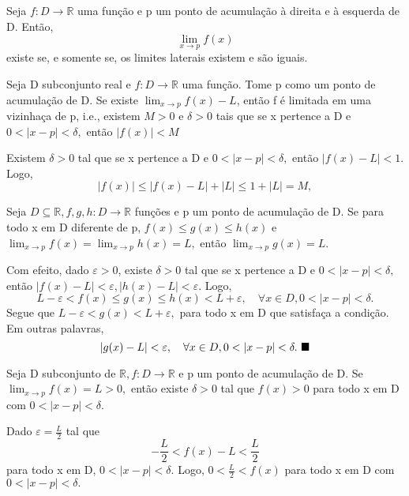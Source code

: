 \documentclass[Analysis/analysis_notes.tex]{subfiles}
\begin{document}
\begin{crl*}
	Seja $f:D\rightarrow \mathbb{R}$ uma fun\c c\~ao e p um ponto de acumula\c c\~ao \`a direita e \`a esquerda de D. Ent\~ao,
	$$
		\lim_{x\to p}f(x)
	$$
	existe se, e somente se, os limites laterais existem e s\~ao iguais.
\end{crl*}
\begin{theorem*}
	Seja D subconjunto real e $f:D\rightarrow \mathbb{R}$ uma fun\c c\~ao. Tome p como um ponto de acumula\c c\~ao de D. Se
	existe $\lim_{x\to p}f(x) - L$, ent\~ao f \'e limitada em uma vizinha\c ca de p, i.e., existem $M>0$ e $\delta > 0$ tais que
	se x pertence a D e $0 <|x-p| < \delta,$ ent\~ao $|f(x)|< M$
\end{theorem*}
\begin{proof*}
	Existem $\delta > 0$ tal que se x pertence a D e $0<|x-p|<\delta,$ ent\~ao $|f(x)-L|<1.$ Logo,
	$$
		|f(x)| \leq{|f(x)-L| + |L|} \leq{1 + |L| = M},
	$$
\end{proof*}
\begin{theorem*}
	Seja $D\subseteq{\mathbb{R}}, f, g, h:D\rightarrow \mathbb{R}$ fun\c c\~oes e p um ponto de acumula\c c\~ao de D. Se
	para todo x em D diferente de p, $f(x)\leq{g(x)}\leq{h(x)}$ e $\lim_{x\to p}f(x) = \lim_{x\to p }h(x) = L,$ ent\~ao $\lim_{x\to p}g(x) = L.$
\end{theorem*}
\begin{proof*}
	Com efeito, dado $\varepsilon > 0$, existe $\delta > 0$ tal que se x pertence a D e $0 < |x-p| < \delta,$ ent\~ao
	$|f(x)-L|<\varepsilon, |h(x)-L|<\varepsilon.$ Logo,
	$$
		L - \varepsilon < f(x) \leq{g(x)} \leq{h(x)} < L +\varepsilon, \quad \forall x\in D, 0<|x-p|<\delta.
	$$
	Segue que $L-\varepsilon < g(x) < L+\varepsilon,$ para todo x em D que satisfa\c ca a condi\c c\~ao. Em outras palavras,
	$$
		|g(x)-L| < \varepsilon, \quad \forall x\in D, 0<|x-p|<\delta.\text{ \qedsymbol}
	$$
\end{proof*}
\begin{theorem*}
	Seja D subconjunto de $\mathbb{R}, f:D\rightarrow \mathbb{R}$ e p um ponto de acumula\c c\~ao de D. Se $\lim_{x\to p}f(x) = L > 0,$
	ent\~ao existe $\delta > 0$ tal que $f(x) > 0$ para todo x em D com $0<|x-p|<\delta.$
\end{theorem*}
\begin{proof*}
	Dado $\varepsilon = \frac{L}{2}$ tal que
	$$
		-\frac{L}{2} < f(x) - L < \frac{L}{2}
	$$
	para todo x em D, $0 < |x-p|<\delta.$ Logo, $0 <\frac{L}{2}<f(x)$ para todo x em D com $0 <|x-p|<\delta.$ \qedsymbol
\end{proof*}
\end{document}
